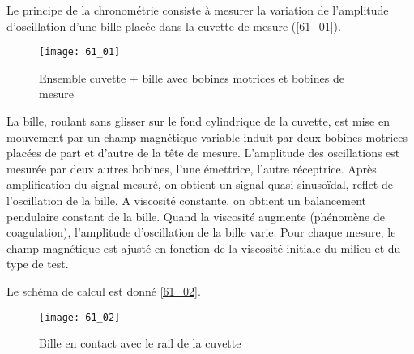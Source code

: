 \normaltrue
\correctionfalse


\setcounter{question}{0}
\ifcorrection
\else
{}
\fi


\ifprof
\else
Le principe de la chronométrie consiste à mesurer la variation de l’amplitude d’oscillation d’une
bille placée dans la cuvette de mesure (\autoref{61_01}).%

\begin{figure}[H]
\centering
\texttt{[image: 61\_01]}
\caption{\label{61_01} Ensemble cuvette + bille avec bobines motrices et bobines de mesure}
\end{figure}

La bille, roulant sans glisser sur le fond cylindrique de la cuvette, est mise en mouvement par un
champ magnétique variable induit par deux bobines motrices placées de part et d’autre de la tête de
mesure.
L’amplitude des oscillations est mesurée par deux autres bobines, l’une émettrice, l’autre réceptrice.
Après amplification du signal mesuré, on obtient un signal quasi-sinusoïdal, reflet de l’oscillation
de la bille. A viscosité constante, on obtient un balancement pendulaire constant de la bille. Quand
la viscosité augmente (phénomène de coagulation), l’amplitude d’oscillation de la bille varie.
Pour chaque mesure, le champ magnétique est ajusté en fonction de la viscosité initiale du milieu et
du type de test.



Le schéma de calcul est donné \autoref{61_02}.


\begin{figure}[H]
\centering
\texttt{[image: 61\_02]}
\caption{\label{61_02} Bille en contact avec le rail de la cuvette}
\end{figure}

